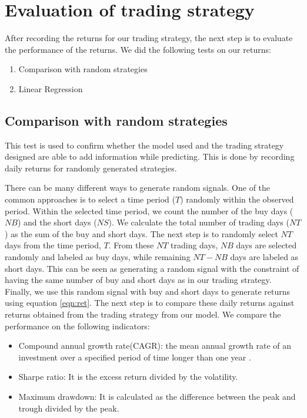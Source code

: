 \section{Evaluation of trading strategy} 
After recording the returns for our trading strategy, the next step is to evaluate the performance of the returns. We did the following tests on our returns:

\begin{enumerate}
\item Comparison with random strategies

\item Linear Regression
\end{enumerate}

\subsection{Comparison with random strategies} \label{ssec:random}
This test is used to confirm whether the model used and the trading strategy designed are able to add information while predicting. This is done by recording daily returns for randomly generated strategies. \par

There can be many different ways to generate random signals. One of the common approaches is to select a time period ($T$) randomly within the observed period. Within the selected time period, we count the number of the buy days ($NB$) and the short days ($NS$). We calculate the total number of trading days ($NT$) as the sum of the buy and short days. The next step is to randomly select $NT$ days from the time period, $T$. From these $NT$ trading days, $NB$ days are selected randomly and labeled as buy days, while remaining $NT-NB$ days are labeled as short days. This can be seen as generating a random signal with the constraint of having the same number of buy and short days as in our trading strategy. Finally, we use this random signal with buy and short days to generate returns using equation \ref{eqn:ret}. The next step is to compare these daily returns against returns obtained from the trading strategy from our model. We compare the performance on the following indicators:

\begin{itemize}
\item Compound annual growth rate(CAGR): the mean annual growth rate of an investment over a specified period of time longer than one year \cite{a10}.

\item Sharpe ratio: It is the excess return divided by the volatility.

\item Maximum drawdown: It is calculated as the difference between the peak and trough divided by the peak.

\end{itemize}

